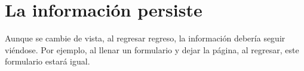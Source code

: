 




\section{La información persiste}

Aunque se cambie de vista, al regresar regreso, la información debería seguir viéndose. Por ejemplo, al llenar un formulario  y dejar la página, al regresar, este formulario estará igual.



